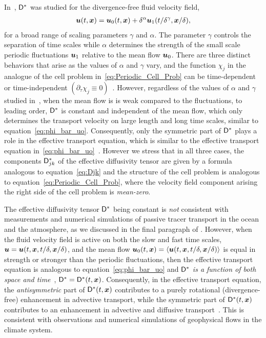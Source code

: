 \documentclass[amsa]{ipart}
\begin{document}
In~\cite{Pavliotis:PHD_Thesis}, $\mathsf{D}^*$ was studied for the 
divergence-free fluid velocity field,
%
\begin{align}
  \vecu(t,\vecx)=\vecu_0(t,\vecx)+\delta^\alpha\vecu_1(t/\delta^\gamma,\vecx/\delta),
\end{align}
%
for a broad range of scaling parameters $\gamma$ and $\alpha$. The parameter $\gamma$
controls the separation of time scales while $\alpha$ determines the
strength of the small scale periodic fluctuations $\boldsymbol{u}_1$ relative
to the mean flow $\boldsymbol{u}_0$. There are three distinct behaviors that
arise as the values of $\alpha$ and $\gamma$ vary, and the function $\chi_j$
in the analogue of the cell problem in~\eqref{eq:Periodic_Cell_Prob}
can be time-dependent or  time-independent
$(\partial_\tau\chi_j\equiv0)$~\cite{Pavliotis:PHD_Thesis}. However, 
regardless of the values of $\alpha$ and $\gamma$ studied
in~\cite{Pavliotis:PHD_Thesis}, when the mean flow is is weak compared
to the fluctuations, to leading order, $\mathsf{D}^*$ is constant and
independent of the mean flow, which only determines the transport
velocity on large length and long time scales, similar to
equation~\eqref{eq:phi_bar_uo}. Consequently, only the symmetric part
of $\mathsf{D}^*$ plays a role in the effective transport equation, which is
similar to the effective transport equation
in~\eqref{eq:phi_bar_uo}~\cite{Pavliotis:PHD_Thesis}.   However we
stress that in all three cases, the components $\mathsf{D}^*_{jk}$ of the
effective diffusivity tensor are given by a formula analogous to
equation~\eqref{eq:Djk} and the structure of the cell problem is
analogous to equation~\eqref{eq:Periodic_Cell_Prob}, where the
velocity field component arising the right side of the cell
problem is \emph{mean-zero}.  



The effective diffusivity tensor $\mathsf{D}^*$ being constant is \emph{not}
consistent with measurements and numerical simulations of passive
tracer transport in 
the ocean and the atmosphere, as we discussed in the final paragraph of  
. However, when the fluid velocity field
is active on both the slow and fast time scales,
$\boldsymbol{u}=\boldsymbol{u}(t,\boldsymbol{x},t/\delta,\boldsymbol{x}/\delta)$, and the mean flow 
$\boldsymbol{u}_0(t,\boldsymbol{x})=\langle\boldsymbol{u}(t,\boldsymbol{x},t/\delta,\boldsymbol{x}/\delta)\rangle$ is
equal in strength or stronger than the 
periodic fluctuations, then the effective transport equation is
analogous to equation~\eqref{eq:phi_bar_uo} and $\mathsf{D}^*$
\emph{is a function of both space and
  time}~\cite{Pavliotis:PHD_Thesis}, $\mathsf{D}^*=\mathsf{D}^*(t,\boldsymbol{x})$.  Consequently, in the effective
transport equation, the \emph{antisymmetric} part of $\mathsf{D}^*(t,\boldsymbol{x})$
contributes to a 
purely rotational (divergence-free) enhancement in advective
transport, while the symmetric part of $\mathsf{D}^*(t,\boldsymbol{x})$ contributes to an
enhancement in advective and diffusive
transport~\cite{Pavliotis:PHD_Thesis}. This is consistent with
observations and numerical simulations of geophysical flows in
the climate system.
\end{document}
